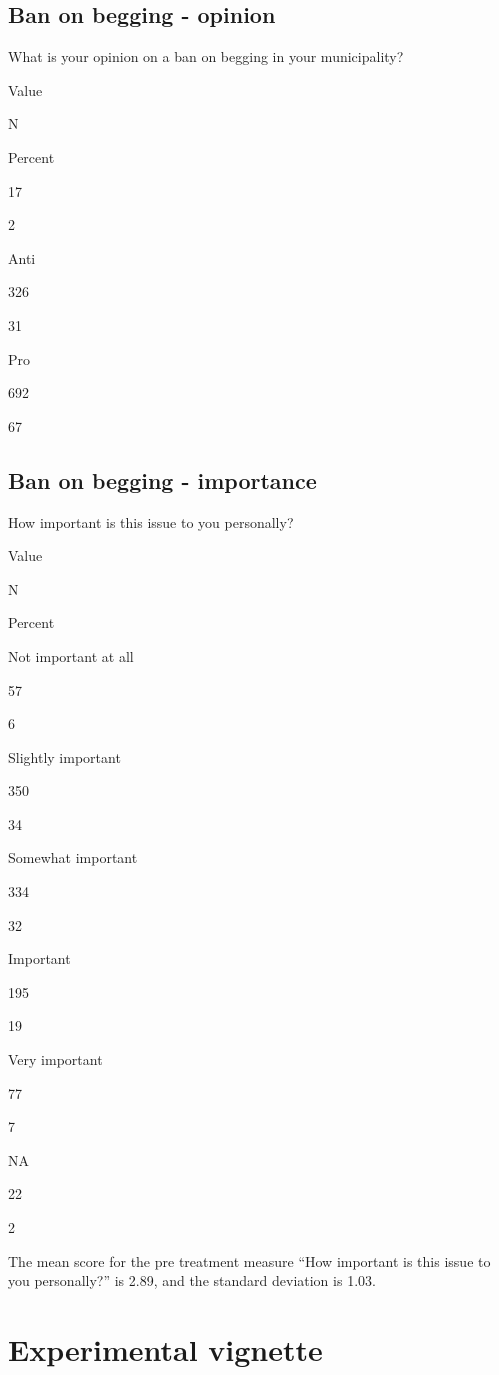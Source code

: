 \documentclass[
]{book}
\begin{document}
\hypertarget{ban-on-begging---opinion-1}{%
\subsection{Ban on begging - opinion}\label{ban-on-begging---opinion-1}}

What is your opinion on a ban on begging in your municipality?

Value

N

Percent

17

2

Anti

326

31

Pro

692

67

\hypertarget{ban-on-begging---importance-1}{%
\subsection{Ban on begging -
importance}\label{ban-on-begging---importance-1}}

How important is this issue to you personally?

Value

N

Percent

Not important at all

57

6

Slightly important

350

34

Somewhat important

334

32

Important

195

19

Very important

77

7

NA

22

2

The mean score for the pre treatment measure ``How important is this
issue to you personally?'' is 2.89, and the standard deviation is 1.03.

\hypertarget{experimental-vignette-1}{%
\section{Experimental vignette}\label{experimental-vignette-1}}
\end{document}
